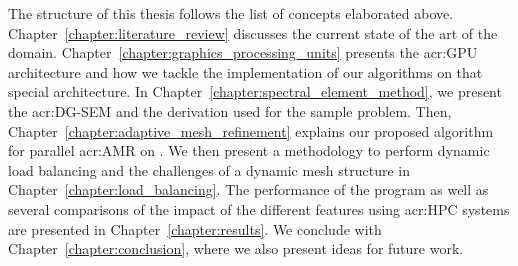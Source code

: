 The structure of this thesis follows the list of concepts elaborated above.
Chapter~\ref{chapter:literature_review} discusses the current state of the art of the domain.
Chapter~\ref{chapter:graphics_processing_units} presents the \acrshort{acr:GPU} architecture and how
we tackle the implementation of our algorithms on that special architecture. In
Chapter~\ref{chapter:spectral_element_method}, we present the \acrshort{acr:DG-SEM} and the
derivation used for the sample problem. Then, Chapter~\ref{chapter:adaptive_mesh_refinement}
explains our proposed algorithm for parallel \acrshort{acr:AMR} on . We then
present a methodology to perform dynamic load balancing and the challenges of a dynamic mesh
structure in Chapter~\ref{chapter:load_balancing}. The performance of the program as well as several
comparisons of the impact of the different features using \acrshort{acr:HPC} systems are presented
in Chapter~\ref{chapter:results}. We conclude with Chapter~\ref{chapter:conclusion}, where we also
present ideas for future work.
